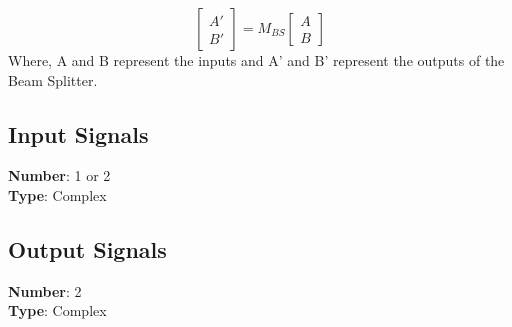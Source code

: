 \begin{equation}
\begin{bmatrix}
A' \\
B'
\end{bmatrix}=M_{BS} \dot{}{\begin{bmatrix}
			  				     A \\
			  	                 B
			  	                 \end{bmatrix}}
\end{equation}
Where, A and B represent the inputs and A' and B' represent the outputs of the Beam Splitter.

\subsection*{Input Signals}

\textbf{Number}: 1 or 2\\
\textbf{Type}: Complex

\subsection*{Output Signals}

\textbf{Number}: 2\\
\textbf{Type}: Complex





%
%

%
%


